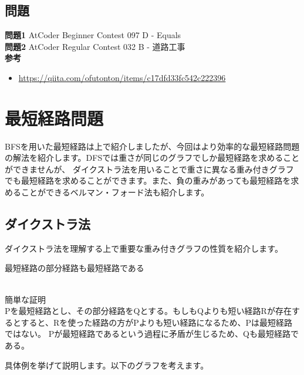 \subsection{問題}
\textbf{問題1} AtCoder Beginner Contest 097 D - Equals \\
\textbf{問題2} AtCoder Regular Contest 032 B - 道路工事 \\

\noindent \textbf{参考} \\
\begin{itemize}
  \item \url{https://qiita.com/ofutonton/items/c17dfd33fc542c222396}
\end{itemize}


\newpage
\section{最短経路問題}
BFSを用いた最短経路は上で紹介しましたが、今回はより効率的な最短経路問題の解法を紹介します。DFSでは重さが同じのグラフでしか最短経路を求めることができませんが、
ダイクストラ法を用いることで重さに異なる重み付きグラフでも最短経路を求めることができます。また、負の重みがあっても最短経路を求めることができるベルマン・フォード法も紹介します。

\subsection{ダイクストラ法}
ダイクストラ法を理解する上で重要な重み付きグラフの性質を紹介します。

\begin{theorembox}[経路緩和性]
  最短経路の部分経路も最短経路である


  \dotfill \\
  簡単な証明 \\
  Pを最短経路とし、その部分経路をQとする。もしもQよりも短い経路Rが存在するとすると、Rを使った経路の方がPよりも短い経路になるため、Pは最短経路ではない。
  Pが最短経路であるという過程に矛盾が生じるため、Qも最短経路である。
\end{theorembox}

具体例を挙げて説明します。以下のグラフを考えます。

\vspace{0.5cm}

